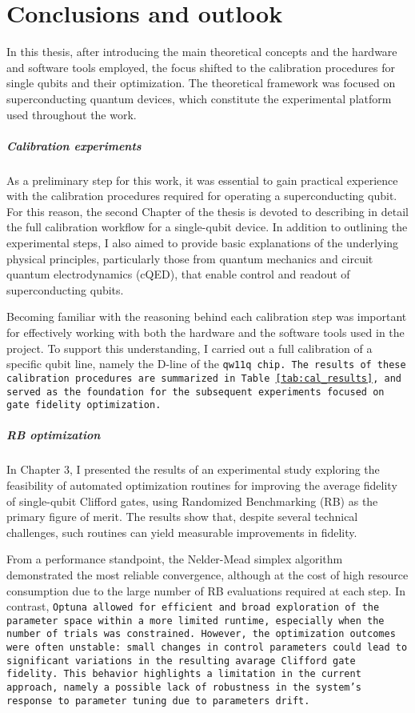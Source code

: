 \chapter{Conclusions and outlook}

In this thesis, after introducing the main theoretical concepts and the hardware and software tools employed, the focus shifted to the calibration procedures for single qubits and their optimization. 
The theoretical framework was focused on superconducting quantum devices, which constitute the experimental platform used throughout the work.

\paragraph{Calibration experiments}
As a preliminary step for this work, it was essential to gain practical experience with the calibration procedures required for operating a superconducting qubit. 
For this reason, the second Chapter of the thesis is devoted to describing in detail the full calibration workflow for a single-qubit device. 
In addition to outlining the experimental steps, I also aimed to provide basic explanations of the underlying physical principles, particularly those from quantum mechanics and circuit quantum electrodynamics (cQED), that enable control and readout of superconducting qubits. 

Becoming familiar with the reasoning behind each calibration step was important for effectively working with both the hardware and the software tools used in the project.
To support this understanding, I carried out a full calibration of a specific qubit line, namely the D-line of the \tt{qw11q} chip. 
The results of these calibration procedures are summarized in Table \ref{tab:cal_results}, and served as the foundation for the subsequent experiments focused on gate fidelity optimization.

\paragraph{RB optimization}
In Chapter 3, I presented the results of an experimental study exploring the feasibility of automated optimization routines for improving the average fidelity of single-qubit Clifford gates, using Randomized Benchmarking (RB) as the primary figure of merit. 
The results show that, despite several technical challenges, such routines can yield measurable improvements in fidelity.

From a performance standpoint, the Nelder-Mead simplex algorithm demonstrated the most reliable convergence, although at the cost of high resource consumption due to the large number of RB evaluations required at each step. 
In contrast, \tt{Optuna} allowed for efficient and broad exploration of the parameter space within a more limited runtime, especially when the number of trials was constrained. 
However, the optimization outcomes were often unstable: small changes in control parameters could lead to significant variations in the resulting avarage Clifford gate fidelity. 
This behavior highlights a limitation in the current approach, namely a possible lack of robustness in the system's response to parameter tuning due to parameters drift.

